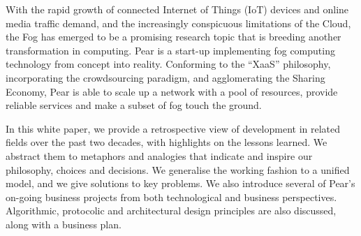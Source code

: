 With the rapid growth of connected Internet of Things (IoT) devices and online media traffic demand, and the increasingly conspicuous limitations of the Cloud, the Fog has emerged to be a promising research topic that is breeding another transformation in computing. Pear is a start-up implementing fog computing technology from concept into reality. Conforming to the ``XaaS'' philosophy, incorporating the crowdsourcing paradigm, and agglomerating the Sharing Economy, Pear is able to scale up a network with a pool of resources, provide reliable services and make a subset of fog touch the ground. 

In this white paper, we provide a retrospective view of development in related fields over the past two decades, with highlights on the lessons learned. We abstract them to metaphors and analogies that indicate and inspire our philosophy, choices and decisions. We generalise the working fashion to a unified model, and we give solutions to key problems. We also introduce several of Pear's on-going business projects from both technological and business perspectives. Algorithmic, protocolic and architectural design principles are also discussed, along with a business plan.   

\vspace{12pt}
